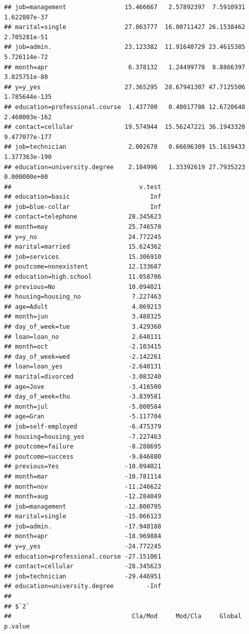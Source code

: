 \documentclass[
]{article}
\begin{document}
\begin{verbatim}
## job=management                15.466667   2.57892397  7.5910931  1.622807e-37
## marital=single                27.863777  16.00711427 26.1538462  2.705281e-51
## job=admin.                    23.123382  11.91640729 23.4615385  5.726114e-72
## month=apr                      6.378132   1.24499778  8.8866397  3.025751e-80
## y=y_yes                       27.365295  28.67941307 47.7125506 1.785644e-135
## education=professional.course  1.437700   0.40017786 12.6720648 2.460003e-162
## contact=cellular              19.574944  15.56247221 36.1943320 9.477077e-177
## job=technician                 2.002670   0.66696309 15.1619433 1.377363e-190
## education=university.degree    2.184996   1.33392619 27.7935223  0.000000e+00
##                                   v.test
## education=basic                      Inf
## job=blue-collar                      Inf
## contact=telephone              28.345623
## month=may                      25.746578
## y=y_no                         24.772245
## marital=married                15.624362
## job=services                   15.306910
## poutcome=nonexistent           12.133687
## education=high.school          11.058706
## previous=No                    10.094021
## housing=housing_no              7.227463
## age=Adult                       4.069213
## month=jun                       3.488325
## day_of_week=tue                 3.429360
## loan=loan_no                    2.640131
## month=oct                      -2.103415
## day_of_week=wed                -2.142261
## loan=loan_yes                  -2.640131
## marital=divorced               -3.083240
## age=Jove                       -3.416500
## day_of_week=thu                -3.839581
## month=jul                      -5.000584
## age=Gran                       -5.117704
## job=self-employed              -6.475379
## housing=housing_yes            -7.227463
## poutcome=failure               -8.288695
## poutcome=success               -9.846880
## previous=Yes                  -10.094021
## month=mar                     -10.781114
## month=nov                     -11.246622
## month=aug                     -12.284049
## job=management                -12.800795
## marital=single                -15.066123
## job=admin.                    -17.940188
## month=apr                     -18.969884
## y=y_yes                       -24.772245
## education=professional.course -27.151061
## contact=cellular              -28.345623
## job=technician                -29.446951
## education=university.degree         -Inf
## 
## $`2`
##                                 Cla/Mod     Mod/Cla     Global      p.value

\end{verbatim}
\end{document}
